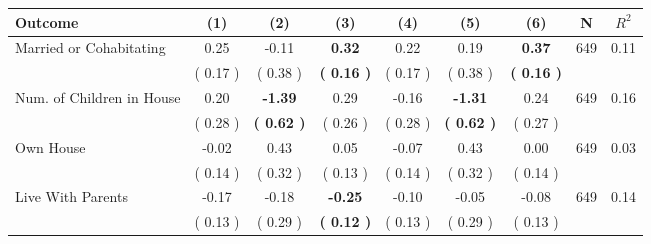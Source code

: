 \begin{tabular}{lcccccccc}
\toprule
 \textbf{Outcome} & \textbf{(1)} & \textbf{(2)} & \textbf{(3)} & \textbf{(4)} & \textbf{(5)} & \textbf{(6)} & \textbf{N} & \textbf{$ R^2$} \\
\midrule
Married or Cohabitating &      0.25 &     -0.11 & \textbf{     0.32} &      0.22 &      0.19 & \textbf{     0.37} & 649 &       0.11 \\ 
 & (     0.17 ) & (     0.38 ) & \textbf{(     0.16 )} & (     0.17 ) & (     0.38 ) & \textbf{(     0.16 )} & \\
Num. of Children in House &      0.20 & \textbf{    -1.39} &      0.29 &     -0.16 & \textbf{    -1.31} &      0.24 & 649 &       0.16 \\ 
 & (     0.28 ) & \textbf{(     0.62 )} & (     0.26 ) & (     0.28 ) & \textbf{(     0.62 )} & (     0.27 ) & \\
Own House &     -0.02 &      0.43 &      0.05 &     -0.07 &      0.43 &      0.00 & 649 &       0.03 \\ 
 & (     0.14 ) & (     0.32 ) & (     0.13 ) & (     0.14 ) & (     0.32 ) & (     0.14 ) & \\
Live With Parents &     -0.17 &     -0.18 & \textbf{    -0.25} &     -0.10 &     -0.05 &     -0.08 & 649 &       0.14 \\ 
 & (     0.13 ) & (     0.29 ) & \textbf{(     0.12 )} & (     0.13 ) & (     0.29 ) & (     0.13 ) & \\
\bottomrule
\end{tabular}

